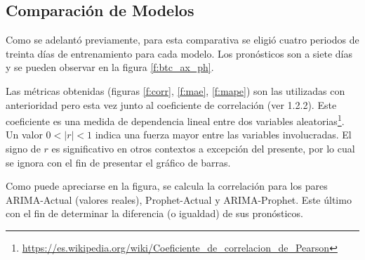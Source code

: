 \documentclass[a4paper,10pt]{article}
\begin{document}
\subsection{Comparación de Modelos}

Como se adelantó previamente, para esta comparativa se eligió cuatro periodos de treinta días de entrenamiento para cada modelo. Los pronósticos son a siete días y se pueden observar en la figura \ref{f:btc_ax_ph}.

Las métricas obtenidas (figuras \ref{f:corr}, \ref{f:mae}, \ref{f:mape}) son las utilizadas con anterioridad pero esta vez junto al coeficiente de correlación (ver 1.2.2). Este coeficiente es una medida de dependencia lineal entre dos variables aleatorias\footnote{\url{https://es.wikipedia.org/wiki/Coeficiente_de_correlacion_de_Pearson}}. Un valor $0<|r|<1$ indica una fuerza mayor entre las variables involucradas. El signo de $r$ es significativo en otros contextos a excepción del presente, por lo cual se ignora con el fin de presentar el gráfico de barras.

Como puede apreciarse en la figura, se calcula la correlación para los pares ARIMA-Actual (valores reales), Prophet-Actual y ARIMA-Prophet. Este último con el fin de determinar la diferencia (o igualdad) de sus pronósticos.
\end{document}
